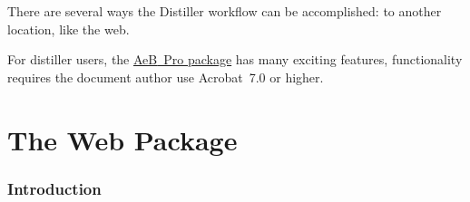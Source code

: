 \documentclass{article}
\def\AEB{\textsf{AeB}}
\def\AEB{\textsf{AeB}}
\begin{document}
{There are several ways the Distiller workflow can be accomplished:
%
%
%
%
to another location, like the web.
%
%

\newtopic For distiller users, the
\href{http://www.math.uakron.edu/~dpstory/aeb_pro.html}{\AEB\ Pro package}
has many exciting features, functionality requires the document author use
Acrobat~7.0 or higher.



\part{The Web Package}\label{s:web}

\section{Introduction}

}
\end{document}
